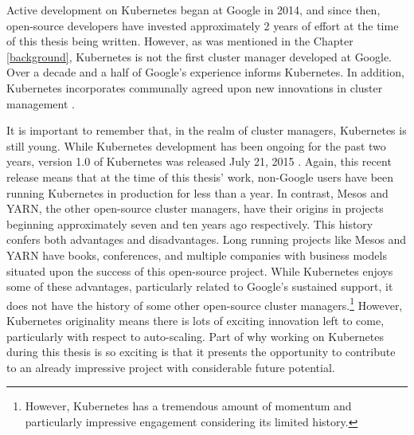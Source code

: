 Active development on Kubernetes began at Google in 2014, and since then,
open-source developers have invested approximately 2 years of effort at the time
of this thesis being written. However,
as was mentioned in the Chapter \ref{background}, Kubernetes is not the first cluster
manager developed at Google. Over a decade and a half of Google's experience
informs Kubernetes. In addition, Kubernetes incorporates communally agreed upon new
innovations in cluster management \cite{what-is-k8s}.

It is important to remember that, in the realm of cluster managers, Kubernetes
is still young. While Kubernetes development has been ongoing for the past two
years, version 1.0 of Kubernetes was released July 21, 2015
\cite{k8s-v1-release}. Again, this recent release means that at the time of this
thesis' work, non-Google users have been running Kubernetes in production for
less than a year. In contrast, Mesos and YARN, the other open-source cluster
managers, have their origins in projects beginning approximately seven and ten years
ago respectively. This history confers both advantages and disadvantages. Long
running projects like Mesos and YARN have books, conferences, and multiple
companies with business models situated upon the success of this open-source
project. While Kubernetes enjoys some of these advantages, particularly related
to Google's sustained support, it does not have the history of some other
open-source cluster managers.\footnote{However, Kubernetes has a tremendous
amount of momentum and particularly impressive engagement considering its
limited history.} However, Kubernetes originality means there is lots of
exciting innovation left to come, particularly with respect to auto-scaling.
Part of why working on Kubernetes during this thesis is so exciting is that it
presents the opportunity to contribute to an already impressive project with
considerable future potential.
